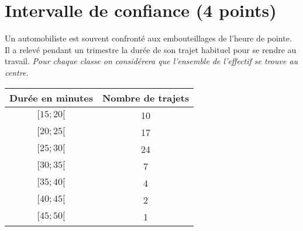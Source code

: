 \section{Intervalle de confiance (4 points)}

Un automobiliste est souvent confronté aux embouteillages de l'heure de pointe. Il a relevé pendant un trimestre la durée de son trajet habituel pour se rendre au travail. \emph{Pour chaque classe on considérera que l'ensemble de l'effectif se trouve au centre.}

\vspace*{0.5cm}

\begin{center}
	\begin{tabular}{|c|c|}
	\hline
	Durée en minutes & Nombre de trajets \\ \hline
	$[15 ; 20[$        & 10                \\ \hline
	$[20 ; 25[$        & 17                \\ \hline
	$[25 ; 30[$        & 24                \\ \hline
	$[30 ; 35[$        & 7                 \\ \hline
	$[35 ; 40[$        & 4                 \\ \hline
	$[40 ; 45[$        & 2                 \\ \hline
	$[45 ; 50[$        & 1                 \\ \hline
\end{tabular}
\end{center}

